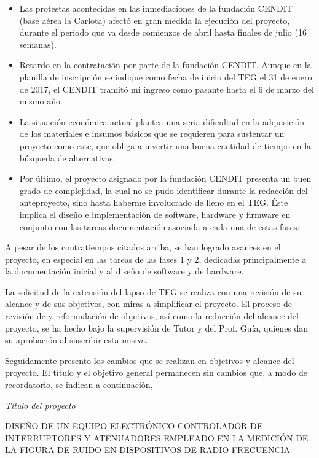 \documentclass[paper=letter,oneside,fontsize=12pt, parskip=full]{article}
\begin{document}
	\begin{itemize}
		\item Las protestas acontecidas en las inmediaciones de la fundación CENDIT (base aérea la Carlota) afectó en gran medida la ejecución del proyecto, durante el periodo que va desde comienzos de abril hasta finales de julio (16 semanas).
	
		\item Retardo en la contratación por parte de la fundación CENDIT. Aunque en la planilla de inscripción se indique como fecha de inicio del TEG el 31 de enero de 2017, el CENDIT tramitó mi ingreso como pasante hasta el 6 de marzo del mismo año. 
		
		\item La situación económica actual plantea una seria dificultad en la adquisición de los materiales e insumos básicos que se requieren para sustentar un proyecto como este, que obliga a invertir una buena cantidad de tiempo en la búsqueda de alternativas.
	
		\item Por último, el proyecto asignado por la fundación CENDIT presenta un buen grado de complejidad, la cual no se pudo identificar durante la redacción del anteproyecto, sino hasta haberme involucrado de lleno en el TEG. Éste implica el diseño e implementación de software, hardware y firmware en conjunto con las tareas documentación asociada a cada una de estas fases.
	\end{itemize}
	
	A pesar de los contratiempos citados arriba, se han logrado avances en el proyecto, en especial en las tareas de las fases 1 y 2, dedicadas principalmente a la documentación inicial y al diseño de software y de hardware. 
	
	La solicitud de la extensión del lapso de TEG se realiza con una revisión de su alcance y de sus objetivos, con miras a simplificar el proyecto. El proceso de revisión de y reformulación de objetivos, así como la reducción del alcance del proyecto, se ha hecho bajo la supervisión de Tutor y del Prof. Guía, quienes dan su aprobación al suscribir esta misiva. 
	
	Seguidamente presento los cambios que se realizan en objetivos y alcance del proyecto. El título y el objetivo general permanecen sin cambios que, a modo de recordatorio, se indican a continuación,	
	
	\emph{Título del proyecto}

	\begin{minipage}{0.95\textwidth}
		\centering
		DISEÑO DE UN EQUIPO ELECTRÓNICO CONTROLADOR DE INTERRUPTORES Y ATENUADORES EMPLEADO EN LA MEDICIÓN DE LA FIGURA DE RUIDO EN DISPOSITIVOS DE RADIO FRECUENCIA
	\end{minipage}
\end{document}
